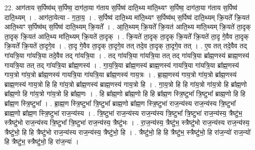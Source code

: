 \documentclass[17pt]{extarticle}
\begin{document}
22. आग॑ताय स॒र्पिष्व॑थ् स॒र्पिष्व॒ दाग॑ता॒या ग॑ताय स॒र्पिष्व॑ दाति॒थ्य मा॑ति॒थ्यꣳ स॒र्पिष्व॒ दाग॑ता॒या ग॑ताय स॒र्पिष्व॑ दाति॒थ्यम् । . आग॑ता॒येत्या - ग॒ता॒य॒ । . स॒र्पिष्व॑ दाति॒थ्य मा॑ति॒थ्यꣳ स॒र्पिष्व॑थ् स॒र्पिष्व॑ दाति॒थ्यम् क्रि॒यते᳚ क्रि॒यत॑ आति॒थ्यꣳ स॒र्पिष्व॑थ् स॒र्पिष्व॑ दाति॒थ्यम् क्रि॒यते᳚ । . आ॒ति॒थ्यम् क्रि॒यते᳚ क्रि॒यत॑ आति॒थ्य मा॑ति॒थ्यम् क्रि॒यते॑ ता॒दृक् ता॒दृक् क्रि॒यत॑ आति॒थ्य मा॑ति॒थ्यम् क्रि॒यते॑ ता॒दृक् । . क्रि॒यते॑ ता॒दृक् ता॒दृक् क्रि॒यते᳚ क्रि॒यते॑ ता॒दृ गे॒वैव ता॒दृक् क्रि॒यते᳚ क्रि॒यते॑ ता॒दृगे॒व । . ता॒दृ गे॒वैव ता॒दृक् ता॒दृगे॒व तत् तदे॒व ता॒दृक् ता॒दृगे॒व तत् । . ए॒व तत् तदे॒वैव तद् गा॑यत्रि॒या गा॑यत्रि॒या तदे॒वैव तद् गा॑यत्रि॒या । . तद् गा॑यत्रि॒या गा॑यत्रि॒या तत् तद् गा॑यत्रि॒या ब्रा᳚ह्म॒णस्य॑ ब्राह्म॒णस्य॑ गायत्रि॒या तत् तद् गा॑यत्रि॒या ब्रा᳚ह्म॒णस्य॑ । . गा॒य॒त्रि॒या ब्रा᳚ह्म॒णस्य॑ ब्राह्म॒णस्य॑ गायत्रि॒या गा॑यत्रि॒या ब्रा᳚ह्म॒णस्य॑ गाय॒त्रो गा॑य॒त्रो ब्रा᳚ह्म॒णस्य॑ गायत्रि॒या गा॑यत्रि॒या ब्रा᳚ह्म॒णस्य॑ गाय॒त्रः । . ब्रा॒ह्म॒णस्य॑ गाय॒त्रो गा॑य॒त्रो ब्रा᳚ह्म॒णस्य॑ ब्राह्म॒णस्य॑ गाय॒त्रो हि हि गा॑य॒त्रो ब्रा᳚ह्म॒णस्य॑ ब्राह्म॒णस्य॑ गाय॒त्रो हि । . गा॒य॒त्रो हि हि गा॑य॒त्रो गा॑य॒त्रो हि ब्रा᳚ह्म॒णो ब्रा᳚ह्म॒णो हि गा॑य॒त्रो गा॑य॒त्रो हि ब्रा᳚ह्म॒णः । . हि ब्रा᳚ह्म॒णो ब्रा᳚ह्म॒णो हि हि ब्रा᳚ह्म॒ण स्त्रि॒ष्टुभा᳚ त्रि॒ष्टुभा᳚ ब्राह्म॒णो हि हि ब्रा᳚ह्म॒ण स्त्रि॒ष्टुभा᳚ । . ब्रा॒ह्म॒ण स्त्रि॒ष्टुभा᳚ त्रि॒ष्टुभा᳚ ब्राह्म॒णो ब्रा᳚ह्म॒ण स्त्रि॒ष्टुभा॑ राज॒न्य॑स्य राज॒न्य॑स्य त्रि॒ष्टुभा᳚ ब्राह्म॒णो ब्रा᳚ह्म॒ण स्त्रि॒ष्टुभा॑ राज॒न्य॑स्य । . त्रि॒ष्टुभा॑ राज॒न्य॑स्य राज॒न्य॑स्य त्रि॒ष्टुभा᳚ त्रि॒ष्टुभा॑ राज॒न्य॑स्य॒ त्रैष्टु॑भ॒ स्त्रैष्टु॑भो राज॒न्य॑स्य त्रि॒ष्टुभा᳚ त्रि॒ष्टुभा॑ राज॒न्य॑स्य॒ त्रैष्टु॑भः । . रा॒ज॒न्य॑स्य॒ त्रैष्टु॑भ॒ स्त्रैष्टु॑भो राज॒न्य॑स्य राज॒न्य॑स्य॒ त्रैष्टु॑भो॒ हि हि त्रैष्टु॑भो राज॒न्य॑स्य राज॒न्य॑स्य॒ त्रैष्टु॑भो॒ हि । . त्रैष्टु॑भो॒ हि हि त्रैष्टु॑भ॒ स्त्रैष्टु॑भो॒ हि रा॑ज॒न्यो॑ राज॒न्यो॑ हि त्रैष्टु॑भ॒ स्त्रैष्टु॑भो॒ हि रा॑ज॒न्यः॑ । \newline
\end{document}
